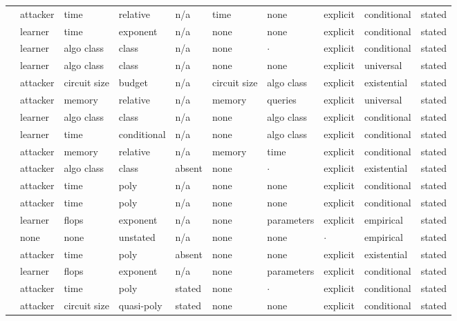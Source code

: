 \begin{landscape}
\begin{longtable}{rlllllllll}
\cite{BRSV17} & attacker & time & relative & n/a & time & none & explicit & conditional & stated \\
\cite{DLSW25} & learner & time & exponent & n/a & none & none & explicit & conditional & stated \\
\cite{BAHSWZ22} & learner & algo class & class & n/a & none & $\cdot$ & explicit & conditional & stated \\
\cite{BHKKMP16} & learner & algo class & class & n/a & none & none & explicit & universal & stated \\
\cite{BJRZ24} & attacker & circuit size & budget & n/a & circuit size & algo class & explicit & existential & stated \\
\cite{GZ19} & attacker & memory & relative & n/a & memory & queries & explicit & universal & stated \\
\cite{BBHLS21} & learner & algo class & class & n/a & none & algo class & explicit & conditional & stated \\
\cite{BRST21} & learner & time & conditional & n/a & none & algo class & explicit & conditional & stated \\
\cite{BCEQ24} & attacker & memory & relative & n/a & memory & time & explicit & conditional & stated \\
\cite{CIM19} & attacker & algo class & class & absent & none & $\cdot$ & explicit & existential & stated \\
\cite{HMSTY25} & attacker & time & poly & n/a & none & none & explicit & conditional & stated \\
\cite{MR26} & attacker & time & poly & n/a & none & none & explicit & conditional & stated \\
\cite{HBMBCRCHWCHNMDDGOSERVS22} & learner & flops & exponent & n/a & none & parameters & explicit & empirical & stated \\
\cite{BEBY24} & none & none & unstated & n/a & none & none & $\cdot$ & empirical & stated \\
\cite{MPRV09} & attacker & time & poly & absent & none & none & explicit & existential & stated \\
\cite{PPXP24} & learner & flops & exponent & n/a & none & parameters & explicit & conditional & stated \\
\cite{CK21} & attacker & time & poly & stated & none & $\cdot$ & explicit & conditional & stated \\
\cite{ABIKN23} & attacker & circuit size & quasi-poly & stated & none & none & explicit & conditional & stated \\

\end{longtable}
\end{landscape}
